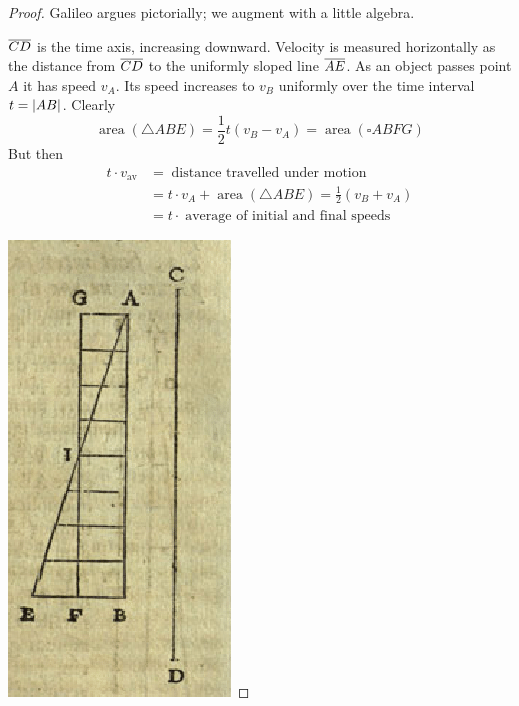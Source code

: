 \begin{proof}
Galileo argues pictorially; we augment with a little algebra.\par
\begin{minipage}[t]{0.8\linewidth}\vspace{-5pt}
$\overline{CD}$ is the time axis, increasing downward. Velocity is measured horizontally as the distance from $\overline{CD}$ to the uniformly sloped line $\overline{AE}$.\smallbreak
As an object passes point $A$ it has speed $v_A$. Its speed increases to $v_B$ uniformly over the time interval $t=\left| AB\right|$. Clearly
  \[\operatorname{area}(\triangle ABE)=\frac 12t(v_B-v_A)=\operatorname{area}(\square ABFG)\]
  But then
\begin{align*}
t\cdot v_{\text{av}}&=\operatorname{distance\ travelled\ under\ motion}\\
&=t\cdot v_A+\operatorname{area}(\triangle ABE)=\frac 12(v_B+v_A)\\
&=t\cdot\operatorname{average\ of\ initial\ and\ final\ speeds}%
\end{align*}
\end{minipage}\hfill\begin{minipage}[t]{0.18\linewidth}\vspace{-20pt}
\flushright\includegraphics[scale=0.45]{galileo-accel}
\end{minipage}
\end{proof}

